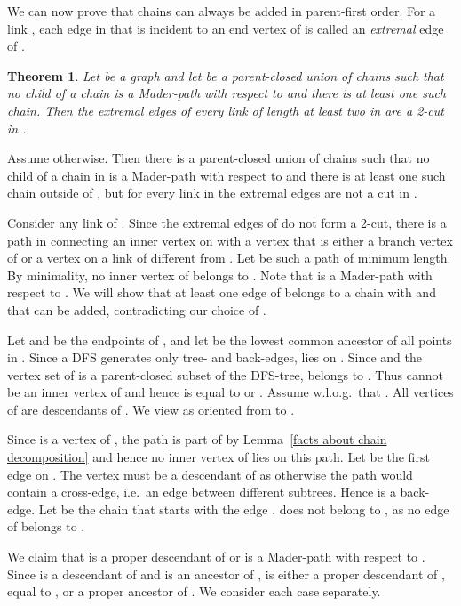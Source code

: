\documentclass[paper=a4]{scrartcl}
\newtheorem{theorem}{Theorem}
\newcommand{\mqed}{\hfill}
\newlength{\proofpostskipamount}\newlength{\proofpreskipamount}
\newenvironment{proof}{\par\vspace{\proofpreskipamount}\noindent{\textbf{Proof:}}\hspace{0.5em}}{\nopagebreak \strut\nopagebreak \hspace{\fill}\mqed\par\vspace{\proofpostskipamount}\noindent}
\begin{document}
We can now prove that chains can always be added in parent-first order. For a link , each edge in  that is incident to an end vertex of  is called an \emph{extremal} edge of .

\begin{theorem}\label{order exists} Let  be a graph and let  be a parent-closed union of chains such that no child of a chain  is a Mader-path with respect to  and there is at least one such chain. Then the extremal edges of every link of length at least two in  are a 2-cut in .
\end{theorem}
\begin{proof} Assume otherwise. Then there is a parent-closed union  of
  chains such that no child of a chain in  is a Mader-path with respect to  and there is at least one such chain outside of , but for every link in  the extremal edges are not a cut in .

Consider any link  of . Since the extremal edges of  do not form a 2-cut, there is a path in  connecting an inner vertex on  with a vertex that is either a branch vertex of  or a vertex on a link of  different from . Let  be such a path of minimum length. By minimality, no inner vertex of  belongs to . Note that  is a Mader-path with respect to . We will show that at least one edge of  belongs to a chain  with  and that  can be added, contradicting our choice of .

Let  and  be the endpoints of , and let  be the lowest common ancestor of all points in . Since a DFS generates only tree- and back-edges,  lies on . Since  and the vertex set of  is a parent-closed subset of the DFS-tree,  belongs to . Thus  cannot be an inner vertex of  and hence is 
equal to  or . Assume w.l.o.g.~that . All vertices of  are descendants of . We view  as oriented from  to .

Since  is a vertex of , the path  is part of  by Lemma~\ref{facts about chain decomposition} and hence no inner vertex of  lies on this path. Let  be the first edge on . The vertex  must be a descendant of  as otherwise the path  would contain a cross-edge, i.e.\ an edge between different subtrees. Hence  is a back-edge. Let  be the chain that starts with the edge .  does not belong to , as no edge of  belongs to .

We claim that  is a proper descendant of  or  is a Mader-path with respect to . Since  is a descendant of  and  is an ancestor of ,  is either a proper descendant of , equal to , or a proper ancestor of . We consider each case separately.


\end{proof}
\end{document}
